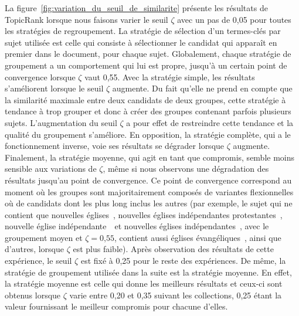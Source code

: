     La figure~\ref{fig:variation_du_seuil_de_similarite} présente les résultats
    de TopicRank lorsque nous faisons varier le seuil $\zeta$ avec un pas de
    0,05 pour toutes les stratégies de regroupement. La stratégie de sélection
    d'un termes-clés par sujet utilisée est celle qui consiste à sélectionner
    le candidat qui apparaît en premier dans le document, pour chaque sujet.
    Globalement, chaque stratégie de groupement a un comportement qui lui est
    propre, jusqu'à un certain point de convergence lorsque $\zeta$ vaut 0,55.
    Avec la stratégie simple, les résultats s'améliorent lorsque le seuil
    $\zeta$ augmente. Du fait qu'elle ne prend en compte que la similarité
    maximale entre deux candidats de deux groupes, cette stratégie à tendance à
    trop grouper et donc à créer des groupes contenant parfois plusieurs sujets.
    L'augmentation du seuil $\zeta$ a pour effet de restreindre cette tendance
    et la qualité du groupement s'améliore. En opposition, la stratégie
    complète, qui a le fonctionnement inverse, voie ses résultats se dégrader
    lorsque $\zeta$ augmente. Finalement, la stratégie moyenne, qui agit en tant
    que compromis, semble moins sensible aux variations de $\zeta$, même si nous
    observons une dégradation des résultats jusqu'au point de convergence. Ce
    point de convergence correspond au moment où les groupes sont
    majoritairement composés de variantes flexionnelles où de candidats dont les
    plus long inclus les autres (par exemple, le sujet qui ne contient que
    \og nouvelles églises~\fg, \og nouvelles églises indépendantes
    protestantes~\fg, \og nouvelle église indépendante~\fg\ et \og nouvelles
    églises indépendantes~\fg, avec le groupement moyen et $\zeta=\text{0,55}$,
    contient aussi \og églises évangéliques~\fg, ainsi que d'autres, lorsque
    $\zeta$ est plus faible).
    Après observation des résultats de cette expérience, le seuil $\zeta$ est
    fixé à 0,25 pour le reste des expériences. De même, la stratégie de
    groupement utilisée dans la suite est la stratégie moyenne. En effet, la
    stratégie moyenne est celle qui donne les meilleurs résultats et ceux-ci
    sont obtenus lorsque $\zeta$ varie entre 0,20 et 0,35 suivant les
    collections, 0,25 étant la valeur fournissant le meilleur compromis pour
    chacune d'elles.
